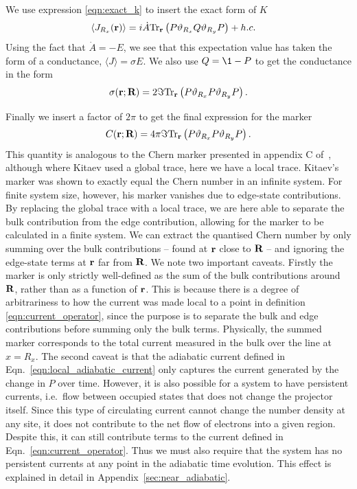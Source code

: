 We use expression \ref{eqn:exact_k} to insert the exact form of $K$
\begin{align} 
    \left \langle J_{R_x}(\textbf r) \right \rangle & = i \dot A \textup{Tr}_{\textbf r} 
    \left ( 
    P\vartheta_{R_x} Q \vartheta_{R_y} P
    \right ) + h.c.
\end{align}
Using the fact that $\dot A = -E$, we see that this expectation value has taken the form of a conductance, $\langle J \rangle = \sigma E$. We also use $Q = \1 - P$ to get the conductance in the form
\begin{align}\label{eqn:marker_form}
    \sigma(\textbf r; \textbf R) = 2 \Im \textup{Tr}_{\textbf r} 
    \left ( 
    P\vartheta_{R_x} P \vartheta_{R_y} P
    \right ).
\end{align}

Finally we insert a factor of $2\pi$ to get the final expression for the marker
\begin{align}
    C(\textbf r;  \textbf R) = 4\pi \Im \textup{Tr}_{\textbf r} 
    \left ( 
    P\vartheta_{R_x} P \vartheta_{R_y} P
    \right ).
\end{align}
This quantity is analogous to the Chern marker presented in appendix C of~\cite{kitaev_anyons_2006}, although where Kitaev used a global trace, here we have a local trace. Kitaev's marker was shown to exactly equal the Chern number in an infinite system. For finite system size, however, his marker vanishes due to edge-state contributions. By replacing the global trace with a local trace, we are here able to separate the bulk contribution from the edge contribution, allowing for the marker to be calculated in a finite system. We can extract the quantised Chern number by only summing over the bulk contributions -- found at $\textbf r$ close to $\textbf R$ -- and ignoring the edge-state terms at $\textbf r$ far from $\textbf R$.
We note two important caveats. Firstly the marker is only strictly well-defined as the sum of the bulk contributions around $\textbf R$, rather than as a function of $\textbf r$. This is because there is a degree of arbitrariness to how the current was made local to a point in definition \ref{eqn:current_operator}, since the purpose is to separate the bulk and edge contributions before summing only the bulk terms. Physically, the summed marker corresponds to the total current measured in the bulk over the line at $x = R_x$. 
The second caveat is that the adiabatic current defined in Eqn.~\ref{eqn:local_adiabatic_current} only captures the current generated by the change in $P$ over time. However, it is also possible for a system to have persistent currents, i.e.~flow between occupied states that does not change the projector itself. Since this type of circulating current cannot change the number density at any site, it does not contribute to the net flow of electrons into a given region. Despite this, it can still contribute terms to the current defined in Eqn.~\ref{eqn:current_operator}. Thus we must also require that the system has no persistent currents at any point in the adiabatic time evolution. This effect is explained in detail in Appendix~\ref{sec:near_adiabatic}.

